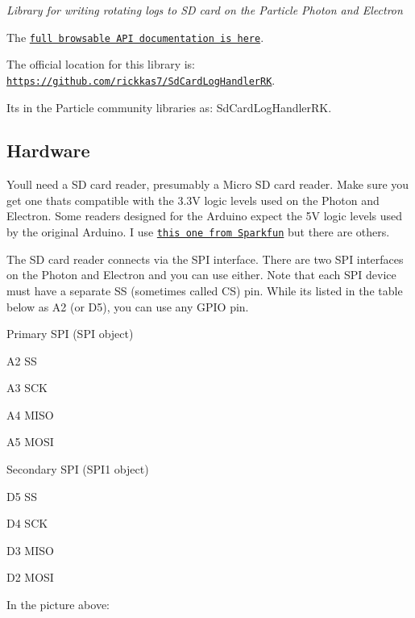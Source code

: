 {\itshape Library for writing rotating logs to SD card on the Particle Photon and Electron}

The \href{http://rickkas7.github.io/SdCardLogHandlerRK/}{\tt full browsable A\+PI documentation is here}.

The official location for this library is\+: \href{https://github.com/rickkas7/SdCardLogHandlerRK}{\tt https\+://github.\+com/rickkas7/\+Sd\+Card\+Log\+Handler\+RK}.

It\textquotesingle{}s in the Particle community libraries as\+: Sd\+Card\+Log\+Handler\+RK.

\subsection*{Hardware}

You\textquotesingle{}ll need a SD card reader, presumably a Micro SD card reader. Make sure you get one that\textquotesingle{}s compatible with the 3.\+3V logic levels used on the Photon and Electron. Some readers designed for the Arduino expect the 5V logic levels used by the original Arduino. I use \href{https://www.sparkfun.com/products/13743}{\tt this one from Sparkfun} but there are others.

  The SD card reader connects via the S\+PI interface. There are two S\+PI interfaces on the Photon and Electron and you can use either. Note that each S\+PI device must have a separate SS (sometimes called CS) pin. While it\textquotesingle{}s listed in the table below as A2 (or D5), you can use any G\+P\+IO pin.

Primary S\+PI (S\+PI object)


\begin{DoxyItemize}
\item A2 SS
\item A3 S\+CK
\item A4 M\+I\+SO
\item A5 M\+O\+SI
\end{DoxyItemize}

Secondary S\+PI (S\+P\+I1 object)


\begin{DoxyItemize}
\item D5 SS
\item D4 S\+CK
\item D3 M\+I\+SO
\item D2 M\+O\+SI
\end{DoxyItemize}

In the picture above\+:

